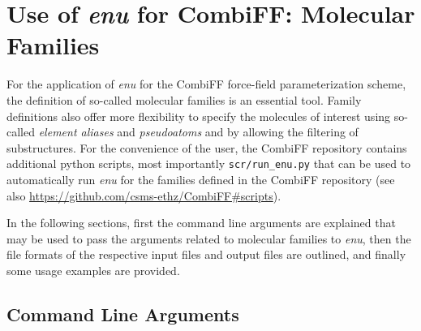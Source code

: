 \documentclass[a4paper,11pt]{article}
\begin{document}
\clearpage

\section{Use of \textit{enu} for CombiFF: Molecular Families}\label{sec:families}

For the application of \textit{enu} for the CombiFF force-field parameterization scheme, the definition of so-called molecular families is an essential tool. Family definitions also offer more flexibility to specify the molecules of interest using so-called \textit{element aliases} and \textit{pseudoatoms} and by allowing the filtering of substructures.\cite{Rieder2022} For the convenience of the user, the CombiFF repository contains additional python scripts, most importantly \texttt{scr/run\_enu.py} that can be used to automatically run \textit{enu} for the families defined in the CombiFF repository (see also \url{https://github.com/csms-ethz/CombiFF#scripts}).

In the following sections, first the command line arguments are explained that may be used to pass the arguments related to molecular families to \textit{enu}, then the file formats of the respective input files and output files are outlined, and finally some usage examples are provided.

\subsection{Command Line Arguments}
\end{document}
